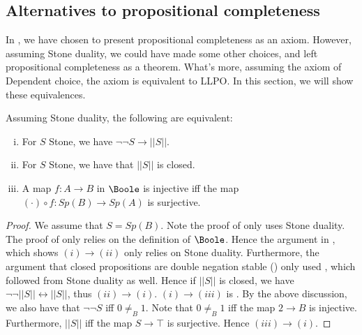 \subsection{Alternatives to propositional completeness}
In , we have chosen to present propositional completeness as an axiom. 
However, assuming Stone duality, we could have made some other choices, 
and left propositional completeness as a theorem. 
What's more, assuming the axiom of Dependent choice,
the axiom is equivalent to LLPO. 
In this section, we will show these equivalences. 

\begin{theorem}\label{AlternativesToAxiom2}
  Assuming Stone duality, the following are equivalent:
  \begin{enumerate}[(i)]
    \item For $S$ Stone, we have $\neg \neg S \to ||S||$. 
    \item For $S$ Stone, we have that $||S||$ is closed. 
    \item A map $f:A \to B$ in $\Boole$ is injective iff the map $(\cdot) \circ f : Sp(B) \to Sp(A)$ is surjective. 
  \end{enumerate}
\end{theorem}
\begin{proof}
  We assume that $S= Sp(B)$. 
  Note the proof of  only uses Stone duality. 
  The proof of  only relies on the definition of $\Boole$.
  Hence the argument in , which shows $(i)\to (ii)$ only relies on Stone duality. 
  Furthermore, the argument that closed propositions are double negation stable ()
  only used , which followed from Stone duality as well. 
  Hence if $||S||$ is closed, we have $\neg \neg ||S|| \leftrightarrow ||S||$, thus $(ii) \to (i)$. 
  $(i)\to (iii)$ is . 
  By the above discussion, we also have that $\neg \neg S$ iff $0\neq_B 1$. 
  Note that $0\neq_B 1$ iff the map $2\to B$ is injective. 
  Furthermore, $||S||$ iff the map $S \to \top $ is surjective. 
  Hence $(iii) \to (i)$. 
\end{proof} 

